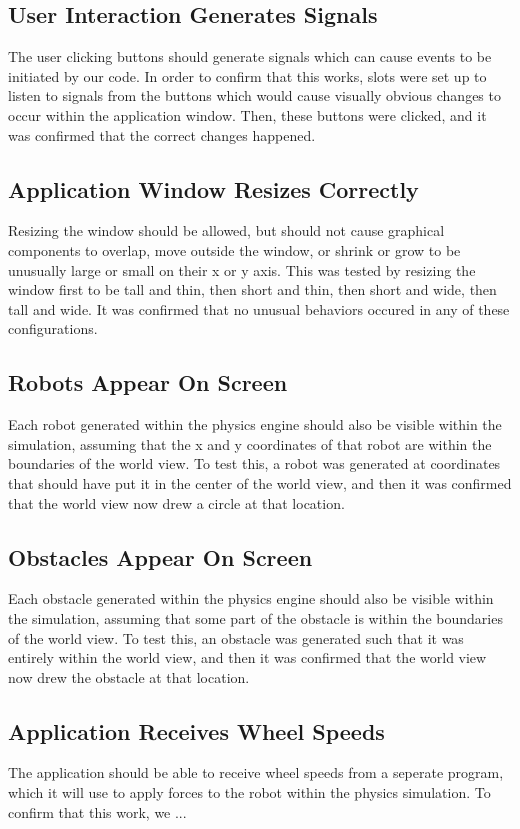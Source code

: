 \subsection{User Interaction Generates Signals}
The user clicking buttons should generate signals which can cause events to be initiated by our code. In order to confirm that this works, slots were set up to listen to signals from the buttons which would cause visually obvious changes to occur within the application window. Then, these buttons were clicked, and it was confirmed that the correct changes happened.

\subsection{Application Window Resizes Correctly}
Resizing the window should be allowed, but should not cause graphical components to overlap, move outside the window, or shrink or grow to be unusually large or small on their x or y axis. This was tested by resizing the window first to be tall and thin, then short and thin, then short and wide, then tall and wide. It was confirmed that no unusual behaviors occured in any of these configurations.

\subsection{Robots Appear On Screen}
Each robot generated within the physics engine should also be visible within the simulation, assuming that the x and y coordinates of that robot are within the boundaries of the world view. To test this, a robot was generated at coordinates that should have put it in the center of the world view, and then it was confirmed that the world view now drew a circle at that location.

\subsection{Obstacles Appear On Screen}
Each obstacle generated within the physics engine should also be visible within the simulation, assuming that some part of the obstacle is within the boundaries of the world view. To test this, an obstacle was generated such that it was entirely within the world view, and then it was confirmed that the world view now drew the obstacle at that location.

\subsection{Application Receives Wheel Speeds}
The application should be able to receive wheel speeds from a seperate program, which it will use to apply forces to the robot within the physics simulation. To confirm that this work, we ... 

